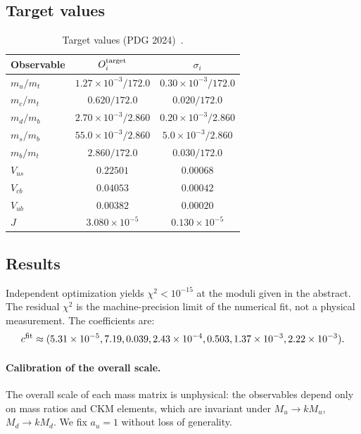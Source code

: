 \documentclass[12pt,a4paper]{article}
\numberwithin{equation}{section}
\begin{document}
\subsection{Target values}
\begin{table}[H]
\centering
\caption{Target values (PDG 2024)~\cite{PDG2024}.}
\begin{tabular}{lcc}
\toprule
Observable & \(O_i^{\rm target}\) & \(\sigma_i\) \\
\midrule
\(m_u/m_t\) & \(1.27\times 10^{-3}/172.0\) & \(0.30\times 10^{-3}/172.0\) \\
\(m_c/m_t\) & \(0.620/172.0\) & \(0.020/172.0\) \\
\(m_d/m_b\) & \(2.70\times 10^{-3}/2.860\) & \(0.20\times 10^{-3}/2.860\) \\
\(m_s/m_b\) & \(55.0\times 10^{-3}/2.860\) & \(5.0\times 10^{-3}/2.860\) \\
\(m_b/m_t\) & \(2.860/172.0\) & \(0.030/172.0\) \\
\(V_{us}\) & \(0.22501\) & \(0.00068\) \\
\(V_{cb}\) & \(0.04053\) & \(0.00042\) \\
\(V_{ub}\) & \(0.00382\) & \(0.00020\) \\
\(J\) & \(3.080\times 10^{-5}\) & \(0.130\times 10^{-5}\) \\
\bottomrule
\end{tabular}
\end{table}

\subsection{Results}
Independent optimization yields \(\chi^2 < 10^{-15}\) at the moduli given in the abstract. The residual \(\chi^2\) is the machine-precision limit of the numerical fit, not a physical measurement. The coefficients are:
\begin{equation}
c^{\rm fit}\approx (5.31\times 10^{-5},7.19,0.039,2.43\times 10^{-4},0.503,1.37\times 10^{-3},2.22\times 10^{-3}).
\end{equation}
\paragraph{Calibration of the overall scale.}
The overall scale of each mass matrix is unphysical: the observables depend only on mass ratios and CKM elements, which are invariant under \(M_u\to kM_u\), \(M_d\to kM_d\). We fix \(a_u = 1\) without loss of generality.
\end{document}
